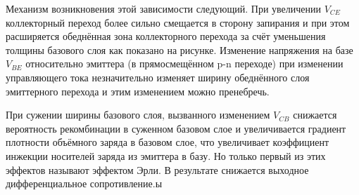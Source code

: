 \documentclass[a4paper]{article}
\begin{document}
Механизм возникновения этой зависимости следующий. При увеличении $V_{CE}$
коллекторный переход более сильно смещается в сторону запирания и при этом расширяется обеднённая зона коллекторного перехода за счёт уменьшения толщины базового слоя как показано на рисунке. Изменение напряжения на базе $V_{BE}$
относительно эмиттера (в прямосмещённом p-n переходе) при изменении управляющего тока незначительно изменяет ширину обеднённого слоя эмиттерного перехода и этим изменением можно пренебречь.

При сужении ширины базового слоя, вызванного изменением $V_{CB}$
снижается вероятность рекомбинации в суженном базовом слое и увеличивается градиент плотности объёмного заряда в базовом слое, что увеличивает коэффициент инжекции носителей заряда из эмиттера в базу. Но только первый из этих эффектов называют эффектом Эрли.
В результате снижается выходное дифференциальное сопротивление.ы
\end{document}
